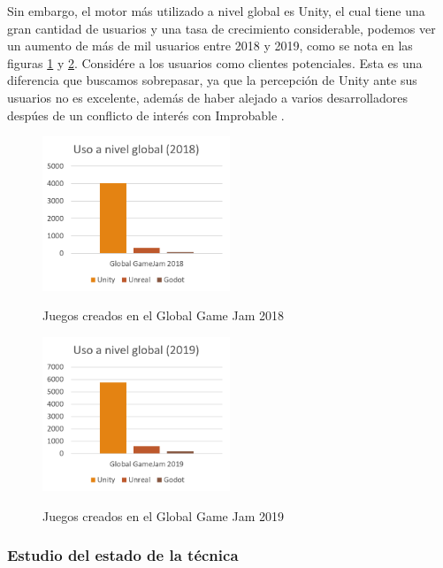 \documentclass[]{article}
\begin{document}
Sin embargo, el motor m\'as utilizado a nivel global es Unity, el cual tiene una gran cantidad de usuarios y una tasa de crecimiento considerable, podemos ver un aumento de m\'as de mil usuarios entre 2018 y 2019, como se nota en las figuras \ref{GGJ2018} y  \ref{GGJ2019}. Consid\'ere a los usuarios como clientes potenciales. Esta es una diferencia que buscamos sobrepasar, ya que la percepci\'on de Unity ante sus usuarios no es excelente, adem\'as de haber alejado a varios desarrolladores desp\'ues de un conflicto de inter\'es con Improbable \cite{Improbable}. 

\begin{figure}[H]
	
	\centering
	\includegraphics[width=0.5\textwidth]{GGJ}
	\caption{Juegos creados en el Global Game Jam 2018} \cite{GGJ2018} 
	\label{GGJ2018}
	
\end{figure}

\begin{figure}[H]
	
	\centering
	\includegraphics[width=0.5\textwidth]{GGJ2019}
	\caption{Juegos creados en el Global Game Jam 2019} \cite{GGJ2019} 
	\label{GGJ2019}
	
\end{figure}

\subsubsection{Estudio del estado de la t\'ecnica}
\end{document}
